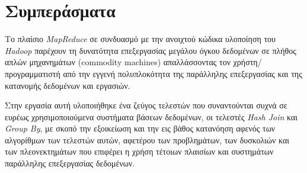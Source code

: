 \documentclass{article}
\newcommand{\en}[1]{\foreignlanguage{english}{#1}}
\begin{document}
\section{Συμπεράσματα} \label{sec:Eval}

Το πλαίσιο \emph{\en{MapReduce}} σε συνδυασμό με την ανοιχτού κώδικα υλοποίηση του \emph{\en{Hadoop}} παρέχουν τη δυνατότητα επεξεργασίας μεγάλου όγκου δεδομένων σε πλήθος απλών μηχανημάτων (\en{commodity machines}) απαλλάσσοντας τον χρήστη/προγραμματιστή από την εγγενή πολυπλοκότητα της παράλληλης επεξεργασίας και της κατανομής δεδομένων και εργασιών.

Στην εργασία αυτή υλοποιήθηκε ένα ζεύγος τελεστών που συναντούνται συχνά σε ευρέως χρησιμοποιούμενα συστήματα βάσεων δεδομένων, οι τελεστές \emph{\en{Hash Join}} και \emph{\en{Group By}}, με σκοπό την εξοικείωση και την εις βάθος κατανόηση αφενός των αλγορίθμων των τελεστών αυτών, αφετέρου των προβλημάτων, των δυσκολιών και των πλεονεκτημάτων που επιφέρει η χρήση τέτοιων πλαισίων και συστημάτων παράλληλης επεξεργασίας δεδομένων.
\end{document}
